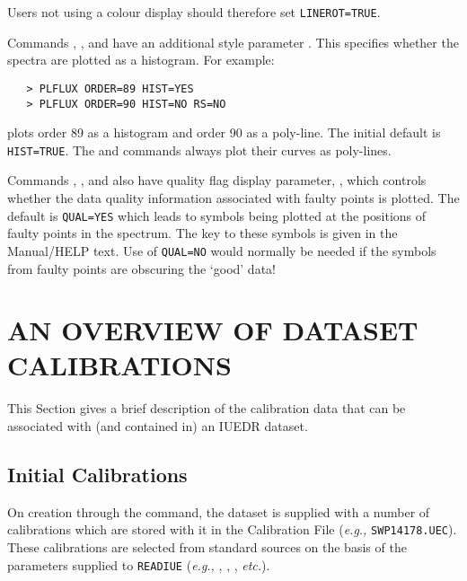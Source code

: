 Users not using a colour display should therefore set \verb+LINEROT=TRUE+\@.

Commands , ,
 and 
 have an additional style parameter \@.
This specifies whether the spectra are plotted as a histogram.
For example:

\begin{verbatim}
   > PLFLUX ORDER=89 HIST=YES
   > PLFLUX ORDER=90 HIST=NO RS=NO
\end{verbatim}

plots order 89 as a histogram and order 90 as a poly-line.  The initial default
is \verb+HIST=TRUE+\@.  The  and
 commands always plot their curves as
poly-lines.

Commands , ,
 and  also
have
quality flag display parameter, , which controls
whether the data
quality information associated with faulty points is plotted.  The default is
\verb+QUAL=YES+ which leads to symbols being plotted at the positions of faulty
points in the spectrum.  The key to these symbols is given in the Manual/HELP
text.  Use of \verb+QUAL=NO+ would normally be needed if the symbols from
faulty points are obscuring the `good' data!


\section{\label{se:data_calib}AN OVERVIEW OF DATASET CALIBRATIONS}

This Section gives a brief description of the calibration data that can be
associated with (and contained in) an IUEDR dataset.


\subsection{Initial Calibrations}

On creation through the 
 command, the dataset is supplied with a
number of calibrations which are stored with it in the Calibration File
({\it{e.g.,}} \verb+SWP14178.UEC+)\@.  These calibrations are selected from
standard sources on the basis of the parameters supplied to \verb+READIUE+
({\it{e.g.,}} ,
,
, {\it etc.})\@.

